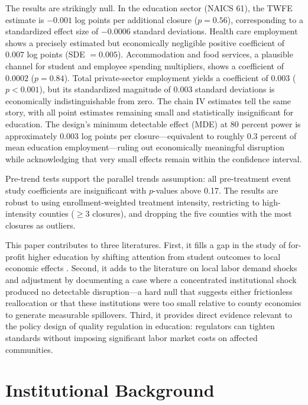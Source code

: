 \documentclass[12pt]{article}
\begin{document}
The results are strikingly null. In the education sector (NAICS 61), the TWFE estimate is $-0.001$ log points per additional closure ($p = 0.56$), corresponding to a standardized effect size of $-0.0006$ standard deviations. Health care employment shows a precisely estimated but economically negligible positive coefficient of $0.007$ log points (SDE $= 0.005$). Accommodation and food services, a plausible channel for student and employee spending multipliers, shows a coefficient of $0.0002$ ($p = 0.84$). Total private-sector employment yields a coefficient of $0.003$ ($p < 0.001$), but its standardized magnitude of 0.003 standard deviations is economically indistinguishable from zero. The chain IV estimates tell the same story, with all point estimates remaining small and statistically insignificant for education. The design's minimum detectable effect (MDE) at 80 percent power is approximately 0.003 log points per closure---equivalent to roughly 0.3 percent of mean education employment---ruling out economically meaningful disruption while acknowledging that very small effects remain within the confidence interval.

Pre-trend tests support the parallel trends assumption: all pre-treatment event study coefficients are insignificant with $p$-values above 0.17. The results are robust to using enrollment-weighted treatment intensity, restricting to high-intensity counties ($\geq 3$ closures), and dropping the five counties with the most closures as outliers.

This paper contributes to three literatures. First, it fills a gap in the study of for-profit higher education by shifting attention from student outcomes to local economic effects \citep{cellini2020gainful, looney2015student}. Second, it adds to the literature on local labor demand shocks and adjustment \citep{blanchard1992regional, notowidigdo2020incidence, greenstone2015do} by documenting a case where a concentrated institutional shock produced no detectable disruption---a hard null that suggests either frictionless reallocation or that these institutions were too small relative to county economies to generate measurable spillovers. Third, it provides direct evidence relevant to the policy design of quality regulation in education: regulators can tighten standards without imposing significant labor market costs on affected communities.

\section{Institutional Background}
\end{document}
